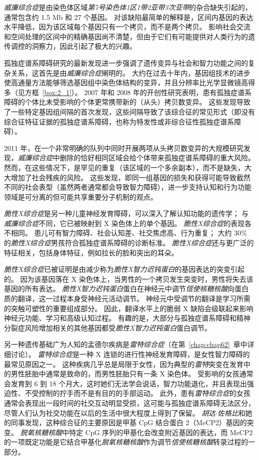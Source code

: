 \textit{威廉综合症}是由染色体区域\textit{第7号染色体1区1带2亚带3次亚带}的杂合缺失引起的，通常包含约 1.5 Mb 和 27 个基因。
对该缺陷最简单的解释是，区间内基因的表达水平降低，因为该区域每个基因只有一个拷贝，而不是两个拷贝。
影响社会交流和空间处理的区间中的精确基因尚不清楚，但由于它们有可能提供对人类行为的遗传调控的洞察力，因此引起了极大的兴趣。


孤独症谱系障碍研究的最新发现进一步强调了遗传变异与社会和智力功能之间的复杂关系，这首先是由\textit{威廉综合症}阐明的。
大约在过去十年内，基因组技术的进步使高通量方法能够筛选基因组中染色体结构的变异，并且分辨率比光学显微镜高得多（见方框~\ref{box:2_1}）。
2007 年和 2008 年的开创性研究表明，患有孤独症谱系障碍的个体比未受影响的个体更常携带新的（从头）拷贝数变异。
这些发现导致了一些特定基因组间隔的首次发现，这些间隔导致了该综合征的常见形式（即没有综合征特征证据的孤独症谱系障碍，也称为特发性或非综合征性孤独症谱系障碍）。


2011 年，在一个非常明确的队列中同时开展两项从头拷贝数变异的大规模研究发现，\textit{威廉综合症}中删除的恰好相同区域会给个体带来孤独症谱系障碍的重大风险。
然而，在这些情况下，是罕见的重复（该区域的一个多余副本），而不是缺失，大大增加了社会残疾的风险。
这些发现，即同一组基因的损失和获得可能导致截然不同的社会表型（虽然两者通常都会导致智力障碍），进一步支持认知和行为功能领域是可分离的但可能共享重要分子机制的观点。


\textit{脆性X综合症}是另一种儿童神经发育障碍，可以深入了解认知功能的遗传学；
与\textit{威廉综合症}不同，它已被映射到 X 染色体上的单个基因。
\textit{脆性X综合症}的表现各不相同。
患儿可有智力障碍、社会认知差、社交焦虑高、行为重复；
大约 30\% 的\textit{脆性X综合症}男孩符合孤独症谱系障碍的诊断标准。
\textit{脆性X综合症}还与更广泛的特征相关，包括身体特征，例如拉长的脸和突出的耳朵。


\textit{脆性X综合症}已被证明是由减少称为\textit{脆性X智力迟钝蛋白}的基因表达的突变引起的。
因为该基因落在 X 染色体上，当男性的一个拷贝发生突变时，男性将失去该基因的所有表达。
\textit{脆性X智力迟钝蛋白}蛋白在神经元中调节\textit{信使核糖核酸}向蛋白质的翻译，这一过程本身受神经元活动调节。
神经元中受调节的翻译是学习所需的突触可塑性的重要组成部分。
因此，翻译水平上的脆弱 X 缺陷会级联起来影响神经元功能、学习和高级认知过程。
有趣的是，大部分与孤独症谱系障碍和精神分裂症风险增加相关的其他基因都受\textit{脆性X智力迟钝蛋白}蛋白调节。


另一种遗传基础广为人知的孟德尔疾病是\textit{雷特综合症}（在第~\ref{chap:chap62}~章中详细讨论）。
\textit{雷特综合症}是一种 X 连锁的进行性神经发育障碍，是女性智力障碍的最常见原因之一。
这种疾病几乎总是局限于女性，因为典型的\textit{雷特}突变在发育中的男性胚胎中通常是致命的，而男性胚胎只有一条 X 染色体。
受影响的女孩通常会发育到 6 到 18 个月大，这时她们无法学会说话，智力功能退化，并且表现出强迫性、不受控制的拧手而不是有目的的手部运动。
此外，患有\textit{雷特综合症}的女孩通常会表现出一段时间的社交互动明显受损，这可能与孤独症谱系障碍无法区分，尽管人们认为社交功能在以后的生活中很大程度上得到了保留。
\textit{胡达$\cdot$佐格比}和她的同事发现，这种综合征的主要原因是甲基 CpG 结合蛋白 2（MeCP2）基因的突变。
\textit{脱氧核糖核酸}中特定 CpG 序列的甲基化会改变附近基因的表达，而 MeCP2 的一项既定功能是它结合甲基化\textit{脱氧核糖核酸}作为调节\textit{信使核糖核酸}转录过程的一部分。


